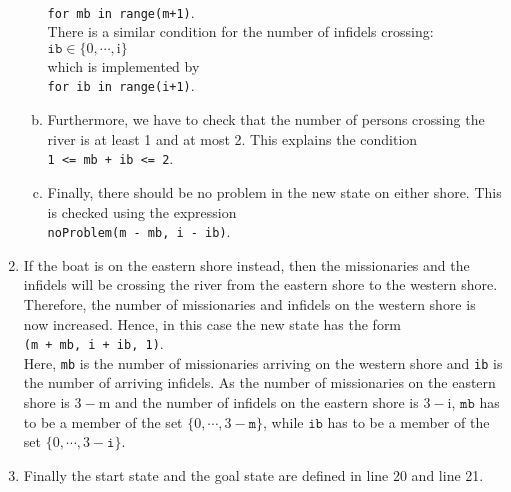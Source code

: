 \begin{enumerate}
\begin{enumerate}[(a)]
            \\[0.2cm]
            \hspace*{1.3cm}
            \texttt{for mb in range(m+1)}.
            \\[0.2cm]
            There is a similar condition for the number of infidels crossing:
            \\[0.2cm]
            \hspace*{1.3cm}
            $\mathtt{ib} \in \{0,\cdots,\mathrm{i}\}$
            \\[0.2cm]
            which is implemented by
            \\[0.2cm]
            \hspace*{1.3cm}
            \texttt{for ib in range(i+1)}.
      \item Furthermore, we have to check that the number of persons crossing the river is at least 1
            and at most 2.  This explains the condition
            \\[0.2cm]
            \hspace*{1.3cm}
            \texttt{1 <= mb + ib <= 2}.
      \item Finally, there should be no problem in the new state on either shore.  This is checked
            using the expression
            \\[0.2cm]
            \hspace*{1.3cm}
            \texttt{noProblem(m - mb, i - ib)}.
      \end{enumerate}
\item If the boat is on the eastern shore instead, then the missionaries and the infidels will be crossing
      the river from the eastern shore to the western shore.  Therefore, the number of missionaries and
      infidels on the western shore is now increased.  Hence, in this case the new state has the form
      \\[0.2cm]
      \hspace*{1.3cm}
      \texttt{(m + mb, i + ib, 1)}.
      \\[0.2cm]
      Here, \texttt{mb} is the number of missionaries arriving on the western shore and \texttt{ib} is the
      number of arriving infidels.
      As the number of missionaries on the eastern shore is $3 - \mathrm{m}$ and the number of infidels on the
      eastern shore is $3 - \mathrm{i}$, $\texttt{mb}$ has to be a member of the set $\{0,\cdots,3 -\mathtt{m}\}$, while
      $\texttt{ib}$ has to be a member of the set $\{0,\cdots,3 - \mathtt{i}\}$.
\item Finally the start state and the goal state are defined in line 20 and line 21.
\end{enumerate}
